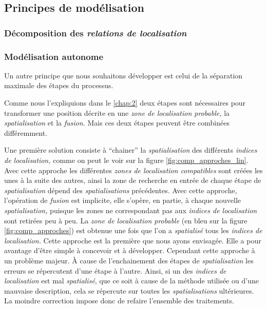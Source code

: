 \subsection{Principes de modélisation}

\subsubsection{Décomposition des \emph{relations de localisation}}

\subsubsection{Modélisation autonome}

Un autre principe que nous souhaitons développer est celui de la
séparation maximale des étapes du processus.

Comme nous l'expliquions dans le \autoref{chap:2} deux étapes sont
nécessaires pour transformer une position décrite en une \emph{zone de
  localisation probable,} la \emph{spatialisation} et la
\emph{fusion.} Mais ces deux étapes peuvent être combinées
différemment.

Une première solution consiste à \enquote{chainer} la
\emph{spatialisation} des différents \emph{indices de localisation,}
comme on peut le voir sur la figure \ref{fig:comp_approches_lin}. Avec
cette approche les différentes \emph{zones de localisation
  compatibles} sont créées les unes à la suite des autres, ainsi la
zone de recherche en entrée de chaque étape de \emph{spatialisation}
dépend des \emph{spatialisations} précédentes. Avec cette approche,
l'opération de \emph{fusion} est implicite, elle s'opère, en partie, à
chaque nouvelle \emph{spatialisation,} puisque les zones ne
correspondant pas aux \emph{indices de localisation} sont retirées peu
à peu. La \emph{zone de localisation probable} (en bleu sur la figure
\ref{fig:comp_approches}) est obtenue une fois que l'on a
\emph{spatialisé} tous les \emph{indices de localisation.} Cette
approche est la première que nous ayons envisagée. Elle a pour
avantage d'être simple à concevoir et à développer. Cependant cette
approche à un problème majeur. À cause de l'enchainement des étapes de
\emph{spatialisation} les erreurs se répercutent d'une étape à
l'autre. Ainsi, si un des \emph{indices de localisation} est mal
\emph{spatialisé}, que ce soit à cause de la méthode utilisée ou d'une
mauvaise description, cela se répercute sur toutes les
\emph{spatialisations} ultérieures. La moindre correction impose donc
de refaire l'ensemble des traitements.


